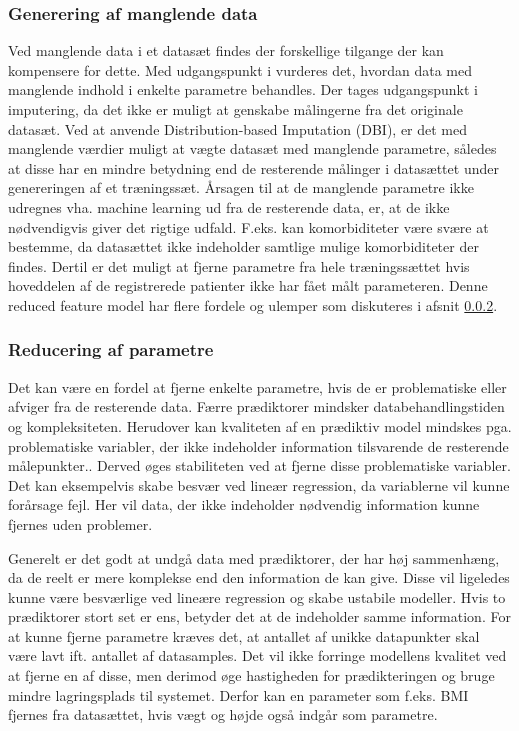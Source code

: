 \subsubsection{Generering af manglende data}
Ved manglende data i et datasæt findes der forskellige tilgange der kan kompensere for dette. Med udgangspunkt i \cite{Saar2007} vurderes det, hvordan data med manglende indhold i enkelte parametre behandles. Der tages udgangspunkt i imputering, da det ikke er muligt at genskabe målingerne fra det originale datasæt. Ved at anvende Distribution-based Imputation (DBI), er det med manglende værdier muligt at vægte datasæt med manglende parametre, således at disse har en mindre betydning end de resterende målinger i datasættet under genereringen af et træningssæt. Årsagen til at de manglende parametre ikke udregnes vha. machine learning ud fra de resterende data, er, at de ikke nødvendigvis giver det rigtige udfald. F.eks. kan komorbiditeter være svære at bestemme, da datasættet ikke indeholder samtlige mulige komorbiditeter der findes. Dertil er det muligt at fjerne parametre fra hele træningssættet hvis hoveddelen af de registrerede patienter ikke har fået målt parameteren. Denne reduced feature model har flere fordele og ulemper som diskuteres i afsnit \ref{reduceringafparametre}. 

\subsubsection{Reducering af parametre}\label{reduceringafparametre}
Det kan være en fordel at fjerne enkelte parametre, hvis de er problematiske eller afviger fra de resterende data. Færre prædiktorer mindsker databehandlingstiden og kompleksiteten. Herudover kan kvaliteten af en prædiktiv model mindskes pga. problematiske variabler, der ikke indeholder information tilsvarende de resterende målepunkter.. Derved øges stabiliteten ved at fjerne disse problematiske variabler. Det kan eksempelvis skabe besvær ved lineær regression, da variablerne vil kunne forårsage fejl. Her vil data, der ikke indeholder nødvendig information kunne fjernes uden problemer.\cite{Kuhn2013}
 
Generelt er det godt at undgå data med prædiktorer, der har høj sammenhæng, da de reelt er mere komplekse end den information de kan give. Disse vil ligeledes kunne være besværlige ved lineære regression og skabe ustabile modeller. Hvis to prædiktorer stort set er ens, betyder det at de indeholder samme information. For at kunne fjerne parametre kræves det, at antallet af unikke datapunkter skal være lavt ift. antallet af datasamples. Det vil ikke forringe modellens kvalitet ved at fjerne en af disse, men derimod øge hastigheden for prædikteringen og bruge mindre lagringsplads til systemet. Derfor kan en parameter som f.eks. BMI fjernes fra datasættet, hvis vægt og højde også indgår som parametre.\cite{Kuhn2013}


